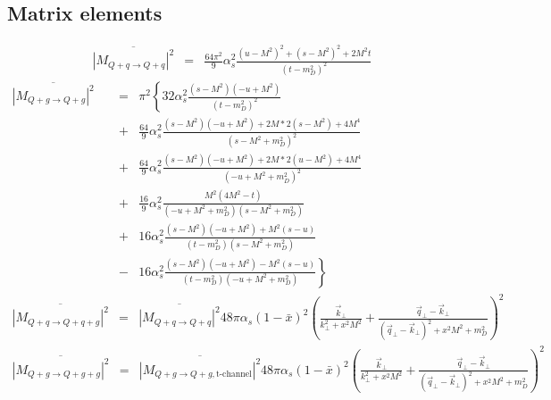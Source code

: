 \documentclass[aps, prc, reprint, amsmath, groupedaddress, nofootinbib]{revtex4-1}
\begin{document}
\begin{appendices}
\section{Matrix elements}
\label{appendix:matrix-element}
\begin{widetext}
\begin{eqnarray}
\overline{|M_{Q+q\rightarrow Q+q}|^2} &=& \frac{64\pi^2}{9}\alpha_s^2 \frac{(u-M^2)^2 + (s-M^2)^2 + 2 M^2 t}{(t-m_D^2)^2}
\end{eqnarray}
\begin{eqnarray}
\overline{|M_{Q+g\rightarrow Q+g}|^2} &=& \pi^2 \left\{
32\alpha_s^2 \frac{(s-M^2)(-u+M^2)}{(t-m_D^2)^2} \right. \\ \nonumber
&+&\frac{64}{9}\alpha_s^2 \frac{(s-M^2)(-u+M^2)+2M*2(s-M^2) + 4M^4}{(s-M^2+m_D^2)^2} \\ \nonumber
&+&\frac{64}{9}\alpha_s^2 \frac{(s-M^2)(-u+M^2)+2M*2(u-M^2) + 4M^4}{(-u+M^2+m_D^2)^2} \\ \nonumber
&+&\frac{16}{9}\alpha_s^2 \frac{M^2(4M^2 - t)}{(-u+M^2+m_D^2)(s-M^2+m_D^2)} \\ \nonumber
&+& 16 \alpha_s^2 \frac{(s-M^2)(-u+M^2)+M^2(s-u)}{(t-m_D^2)(s-M^2+m_D^2)} \\ \nonumber
&-& \left. 16 \alpha_s^2 \frac{(s-M^2)(-u+M^2)-M^2(s-u)}{(t-m_D^2)(-u+M^2+m_D^2)}\right\} \\
\overline{|M_{Q+q\rightarrow Q+q+g}|^2} &=& \overline{|M_{Q+q\rightarrow Q+q}|^2} 48 \pi \alpha_s (1-\bar{x})^2 \left(\frac{\vec{k}_\perp}{k_\perp^2 + x^2 M^2} 
+ \frac{\vec{q}_\perp - \vec{k}_\perp}{(\vec{q}_\perp-\vec{k}_\perp)^2 + x^2 M^2 + m_D^2}
\right)^2 
\end{eqnarray}
\begin{eqnarray}
\overline{|M_{Q+g\rightarrow Q+g+g}|^2} &=& \overline{|M_{Q+g\rightarrow Q+g, \textrm{t-channel}}|^2} 48 \pi \alpha_s (1-\bar{x})^2 \left(\frac{\vec{k}_\perp}{k_\perp^2 + x^2 M^2} 
+ \frac{\vec{q}_\perp - \vec{k}_\perp}{(\vec{q}_\perp-\vec{k}_\perp)^2 + x^2 M^2 + m_D^2}
\right)^2 
\end{eqnarray}
\end{widetext}


\end{appendices}
\end{document}
